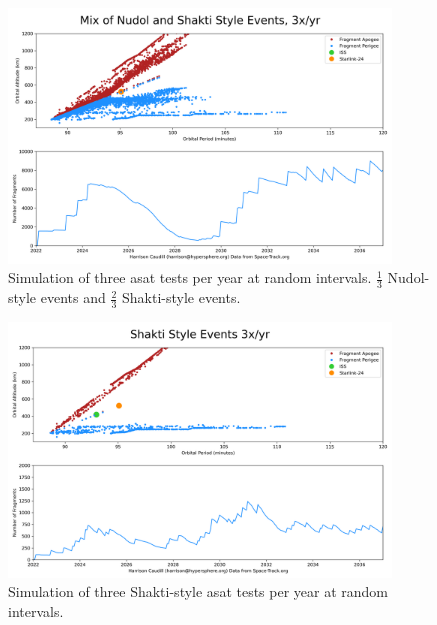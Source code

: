 \begin{figure}[ht!]
  \begin{center}
    \includegraphics[width=4in]{mix.png}
  \end{center}
  \caption{Simulation of three \ac{asat} tests per year at random
    intervals.  $\frac{1}{3}$ Nudol-style events and $\frac{2}{3}$
    Shakti-style events.}
  \label{figure::gabby::doomsday::mix}
\end{figure}

\begin{figure}[ht!]
  \begin{center}
    \includegraphics[width=4in]{shakti.png}
  \end{center}
  \caption{Simulation of three Shakti-style \ac{asat} tests per year
    at random intervals.}
  \label{figure::gabby::doomsday::shakti}
\end{figure}

